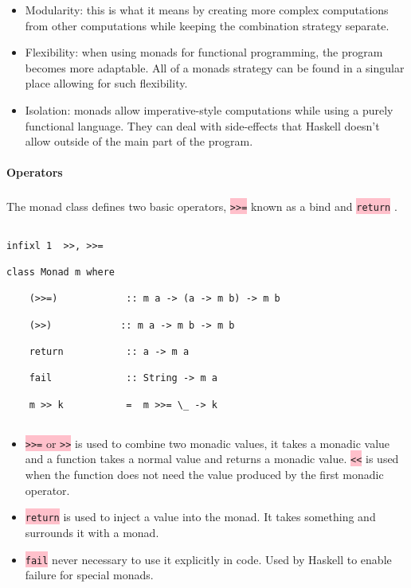 \documentclass{article}
\begin{document}
\begin{itemize}

\item Modularity: this is what it means by creating more complex computations from other computations while keeping the combination strategy separate.

\item Flexibility: when using monads for functional programming, the program becomes more adaptable. All of a monads strategy can be found in a singular place allowing for such flexibility.

\item Isolation: monads allow imperative-style computations while using a purely functional language. They can deal with side-effects that Haskell doesn't allow outside of the main part of the program.

\end{itemize}

\paragraph{Operators}

\subparagraph{}

The monad class defines two basic operators, \colorbox{pink}{ \lstinline{>>=}} known as a bind and \colorbox{pink}{ \lstinline{return}} \cite{AM}.

\break

\begin{lstlisting}

infixl 1  >>, >>=

class Monad m where

    (>>=)            :: m a -> (a -> m b) -> m b

    (>>)            :: m a -> m b -> m b

    return           :: a -> m a

    fail             :: String -> m a

    m >> k           =  m >>= \_ -> k
 
\end{lstlisting}

\begin{itemize}

\item \colorbox{pink}{ \lstinline{>>=} or { \lstinline{>>}}} is used to combine two monadic values, it takes a monadic value and a function takes a normal value and returns a monadic value. \colorbox{pink}{ \lstinline{<<}} is used when the function does not need the value produced by the first monadic operator.

\item \colorbox{pink}{ \lstinline{return}} is used to inject a value into the monad. It takes something and surrounds it with a monad. 

\item \colorbox{pink}{ \lstinline{fail}} never necessary to use it explicitly in code. Used by Haskell to enable failure for special monads. 

\end{itemize}
\end{document}
